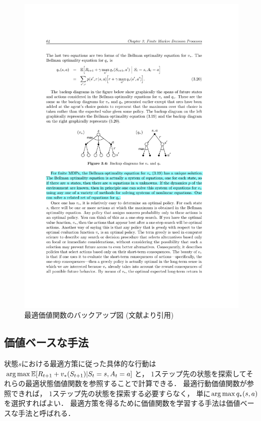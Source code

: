 \begin{figure}[h]
  \centering
  \includegraphics[width=\linewidth{}]{figures/backup.pdf}
  \caption{最適価値関数のバックアップ図 (文献\cite{Sutton1998}より引用)}
  \label{fig:backup}
\end{figure}

\subsection{価値ベースな手法}
状態$s$における最適方策に従った具体的な行動は$\operatorname*{arg\,max} \mathbb{E}[R_{t+1} + v_*(S_{t+1}) | S_t=s, A_t=a]$と， $1$ステップ先の状態を探索してそれらの最適状態価値関数を参照することで計算できる．
最適行動価値関数が参照できれば， $1$ステップ先の状態を探索する必要すらなく， 単に$\operatorname*{arg\,max} q_*(s, a)$を選択すればよい．
最適方策を得るために価値関数を学習する手法は価値ベースな手法と呼ばれる．

